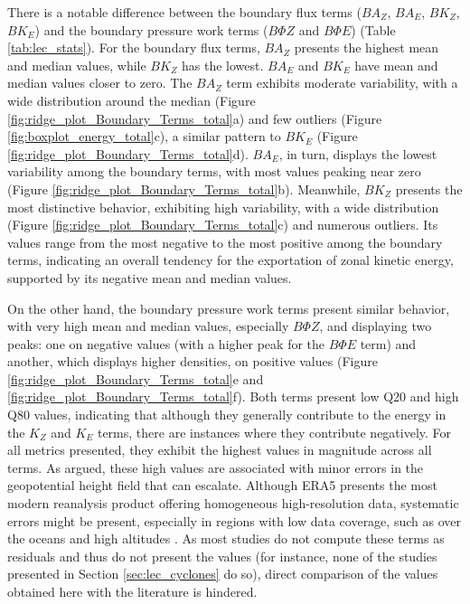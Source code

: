 There is a notable difference between the boundary flux terms ($BA_Z$, $BA_E$, $BK_Z$, $BK_E$) and the boundary pressure work terms ($B\Phi Z$ and $B\Phi E$) (Table \ref{tab:lec_stats}). For the boundary flux terms, $BA_Z$ presents the highest mean and median values, while $BK_Z$ has the lowest. $BA_E$ and $BK_E$ have mean and median values closer to zero. The $BA_Z$ term exhibits moderate variability, with a wide distribution around the median (Figure \ref{fig:ridge_plot_Boundary_Terms_total}a) and few outliers (Figure \ref{fig:boxplot_energy_total}c), a similar pattern to $BK_E$ (Figure \ref{fig:ridge_plot_Boundary_Terms_total}d). $BA_E$, in turn, displays the lowest variability among the boundary terms, with most values peaking near zero (Figure \ref{fig:ridge_plot_Boundary_Terms_total}b). Meanwhile, $BK_Z$ presents the most distinctive behavior, exhibiting high variability, with a wide distribution (Figure \ref{fig:ridge_plot_Boundary_Terms_total}c) and numerous outliers. Its values range from the most negative to the most positive among the boundary terms, indicating an overall tendency for the exportation of zonal kinetic energy, supported by its negative mean and median values.

On the other hand, the boundary pressure work terms present similar behavior, with very high mean and median values, especially $B\Phi Z$, and displaying two peaks: one on negative values (with a higher peak for the $B\Phi E$ term) and another, which displays higher densities, on positive values (Figure \ref{fig:ridge_plot_Boundary_Terms_total}e and \ref{fig:ridge_plot_Boundary_Terms_total}f). Both terms present low Q20 and high Q80 values, indicating that although they generally contribute to the energy in the $K_Z$ and $K_E$ terms, there are instances where they contribute negatively. For all metrics presented, they exhibit the highest values in magnitude across all terms. As \citet{brennan1980zonal} argued, these high values are associated with minor errors in the geopotential height field that can escalate. Although ERA5 presents the most modern reanalysis product offering homogeneous high-resolution data, systematic errors might be present, especially in regions with low data coverage, such as over the oceans and high altitudes \citep{hersbach2020era5}. As most studies do not compute these terms as residuals and thus do not present the values (for instance, none of the studies presented in Section \ref{sec:lec_cyclones} do so), direct comparison of the values obtained here with the literature is hindered.

